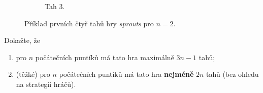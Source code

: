 \begin{enumerate}
\begin{figure}[H]
\begin{subfigure}[b]{.19\textwidth}
    \caption{Tah 3.}
   \end{subfigure}
   \caption{Příklad prvních čtyř tahů hry \emph{sprouts} pro $n = 2$.}
   \label{fig:priklad-sprouts-dole}
  \end{figure}
  Dokažte, že
  \begin{enumerate}[label=(\alph*)]
   \item pro $n$ počátečních puntíků má tato hra maximálně $3n - 1$ tahů;
   \item (těžké) pro $n$ počátečních puntíků má tato hra \textbf{nejméně} $2n$
    tahů (bez ohledu na strategii hráčů).
  \end{enumerate}
\end{enumerate}
